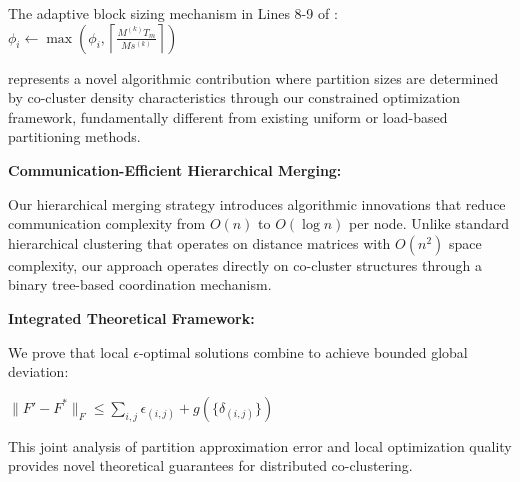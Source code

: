 \documentclass{ar2rc}
\theoremstyle{definition}
\theoremstyle{remark} %
\begin{document}
The adaptive block sizing mechanism in Lines 8-9 of :
$\phi_i \leftarrow \max\left(\phi_i, \left\lceil\frac{M^{(k)}T_m}{Ms^{(k)}}\right\rceil\right)$

represents a novel algorithmic contribution where partition sizes are determined by co-cluster density characteristics through our constrained optimization framework, fundamentally different from existing uniform or load-based partitioning methods.

\textbf{Communication-Efficient Hierarchical Merging:}

Our hierarchical merging strategy introduces algorithmic innovations that reduce communication complexity from $O(n)$ to $O(\log n)$ per node. Unlike standard hierarchical clustering that operates on distance matrices with $O(n^2)$ space complexity, our approach operates directly on co-cluster structures through a binary tree-based coordination mechanism.

\textbf{Integrated Theoretical Framework:}

We prove that local $\epsilon$-optimal solutions combine to achieve bounded global deviation:

$\|F' - F^*\|_F \leq \sum_{i,j} \epsilon_{(i,j)} + g(\{\delta_{(i,j)}\})$

This joint analysis of partition approximation error and local optimization quality provides novel theoretical guarantees for distributed co-clustering.



\end{document}
